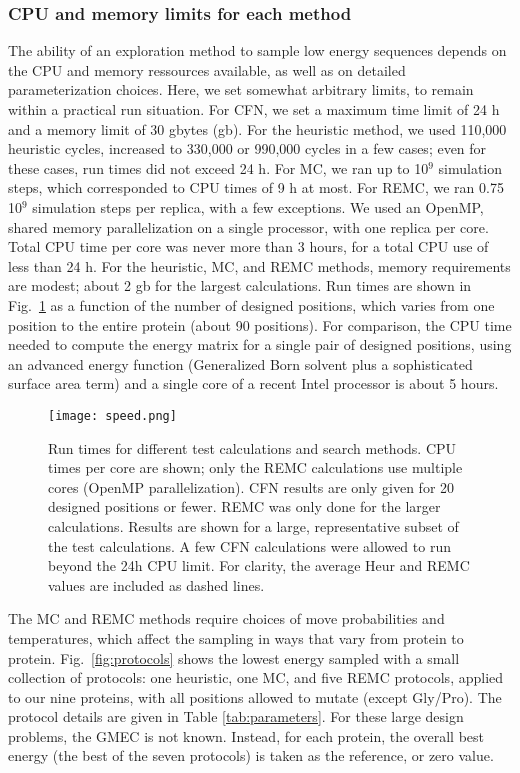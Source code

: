 \subsubsection{CPU and memory limits for each method}
\label{BESTprotocol}
The ability of an exploration method to sample low energy sequences depends on the CPU and memory ressources available, as well as on detailed parameterization choices. Here, we set somewhat arbitrary limits, to remain within a practical run situation. For CFN, we set a maximum time limit of 24 h and a memory limit of 30 gbytes (gb). For the heuristic method, we used 110,000 heuristic cycles, increased to 330,000 or 990,000 cycles in a few cases; even for these cases, run times did not exceed 24 h. For MC, we ran up to 10$^9$ simulation steps, which corresponded to CPU times of 9 h at most. For REMC, we ran 0.75 10$^9$ simulation steps per replica, with a few exceptions. We used an OpenMP, shared memory parallelization on a single processor, with one replica per core. Total CPU time per core was never more than 3 hours, for a total CPU use of less than 24 h. For the heuristic, MC, and REMC methods, memory requirements are modest; about 2 gb for the largest calculations. Run times are shown in Fig.\ \ref{fig:cpu} as a function of the number of designed positions, which varies from one position to the entire protein (about 90 positions). For comparison, the CPU time needed to compute the energy matrix for a single pair of designed positions, using an advanced energy function (Generalized Born solvent plus a sophisticated surface area term) and a single core of a recent Intel processor is about 5 hours.


    \begin{figure}[!htbp]
      \centering
        \texttt{[image: speed.png]} 
      \caption{
Run times for different test calculations and search methods. CPU times per core are shown; only the REMC calculations use multiple cores (OpenMP parallelization). CFN results are only given for 20 designed positions or fewer. REMC was only done for the larger calculations. Results are shown for a large, representative subset of the test calculations. A few CFN calculations were allowed to run beyond the 24h CPU limit. For clarity, the average Heur and REMC values are included as dashed lines.
      }
      
      \label{fig:cpu}
    \end{figure}

The MC and REMC methods require choices of move probabilities and temperatures, which affect the sampling in ways that vary from protein to protein. Fig.\ \ref{fig:protocols} shows the lowest energy sampled with a small collection of protocols: one heuristic, one MC, and five REMC protocols, applied to our nine proteins, with all positions allowed to mutate (except Gly/Pro). The protocol details are given in Table \ref{tab:parameters}. For these large design problems, the GMEC is not known. Instead, for each protein, the overall best energy (the best of the seven protocols) is taken as the reference, or zero value.


